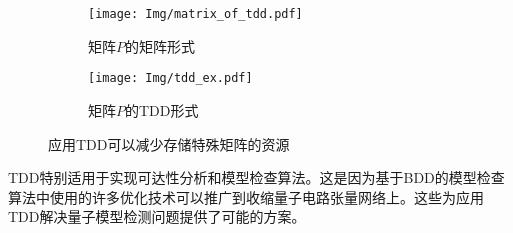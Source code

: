 \begin{figure}[!htbp]
    \begin{subfigure}[c]{0.4\textwidth}
        \centering
        \texttt{[image: Img/matrix\_of\_tdd.pdf]}
        \caption{矩阵$P$的矩阵形式}
        \label{fig:mat_P}
    \end{subfigure}
    \begin{subfigure}[c]{0.4\textwidth}
        \centering
        \texttt{[image: Img/tdd\_ex.pdf]}
        \caption{矩阵$P$的TDD形式}
        \label{fig:tdd_P}
    \end{subfigure}
    \caption{应用TDD可以减少存储特殊矩阵的资源}
    \label{fig:P}
\end{figure}

TDD特别适用于实现可达性分析和模型检查算法。这是因为基于BDD的模型检查算法中使用的许多优化技术可以推广到收缩量子电路张量网络上\citep{Chaki_2018}。这些为应用TDD解决量子模型检测问题提供了可能的方案。



